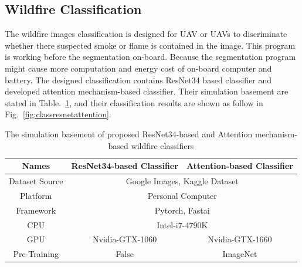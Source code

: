 \subsection{Wildfire Classification}
The wildfire images classification is designed for UAV or UAVs to discriminate whether there suspected smoke or flame is contained in the image. This program is working before the segmentation on-board. Because the segmentation program might cause more computation and energy cost of on-board computer and battery. The designed classification contains ResNet34 based classifier and developed attention mechanism-based classifier. Their simulation basement are stated in Table.~\ref{table:classprogram}, and their classification results are shown as follow in Fig.~\ref{fig:classresnetattention}.
\begin{table}[ht]
\centering
\caption{The simulation basement of proposed ResNet34-based and Attention mechanism-based wildfire classifiers}
\label{table:classprogram}
    \small
    \begin{tabular}{c c c}
    \toprule
        Names & ResNet34-based Classifier &  Attention-based Classifier\\
        \hline
        Dataset Source& \multicolumn{2}{c}{Google Images, Kaggle Dataset}\\
        \rowcolor{mygray}
        Platform & \multicolumn{2}{c}{
        Personal Computer}\\
        Framework &  \multicolumn{2}{c}{Pytorch, Fastai}\\
        \rowcolor{mygray}
        CPU & \multicolumn{2}{c}{Intel-i7-4790K}\\
        \rowcolor{mygray}
        GPU & Nvidia-GTX-1060 & Nvidia-GTX-1660\\
        Pre-Training & False & ImageNet\\
    \bottomrule
    \end{tabular}
\end{table}

